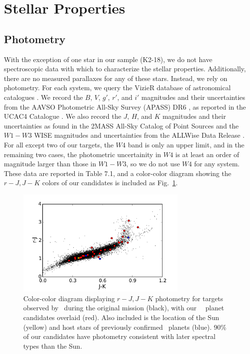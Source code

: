\section{Stellar Properties}
\subsection{Photometry}

With the exception of one star in our sample (K2-18), we do not have
spectroscopic data with which to characterize the stellar properties.
Additionally, there are no measured parallaxes for any of these stars.
Instead, we rely on photometry.
For each system, we query the VizieR database of astronomical catalogues
\citep{Ochseinbein00}.
We record the $B$, $V$, $g'$, $r'$, and $i'$ magnitudes and their
uncertainties from the AAVSO Photometric All-Sky Survey (APASS) DR6
\citep{Henden14}, as reported in the UCAC4 Catalogue \citep{Zacharias12}.
We also record the $J$, $H$, and $K$ magnitudes and their uncertainties
as found in the 2MASS All-Sky Catalog of Point Sources \citep{Cutri03}
and the $W1-W3$ WISE magnitudes and uncertainties from the ALLWise Data
Release \citep{Cutri13}.
For all except two of our targets, the $W4$ band is only an upper limit,
and in the remaining two cases, the photometric uncertainity in $W4$ is at least an
order of magnitude larger than those in $W1-W3$, so we do not use $W4$
for any system.
These data are reported in Table 7.1, and a color-color diagram showing the
$r-J, J-K$ colors of our candidates is included as Fig.~\ref{fig:photometry}.

\begin{figure}[htbp]
\centerline{\includegraphics[width=0.75\textwidth]{chapter7/f1.pdf}}
\caption[Color-color diagram showing \kep\ targets with our own \KT\ planet candidates overlaid.]
{Color-color diagram displaying $r-J, J-K$ photometry for targets
observed by \kep\ during the original
mission (black), with our \KT\ \Ci\ planet candidates overlaid (red).
Also included is the location of the Sun (yellow) and host stars of previously
confirmed \KT\ planets (blue).
90\% of our candidates have photometry consistent with later spectral
types than the Sun.}
\label{fig:photometry}
\end{figure}


